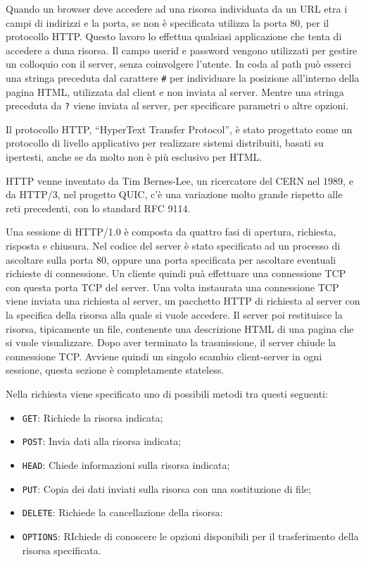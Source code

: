 \documentclass{article}
\numberwithin{equation}{subsection}
\begin{document}

Quando un browser deve accedere ad una risorsa individuata da un URL etra i campi di indirizzi e la porta, se non è specificata utilizza la porta 80, per il protocollo 
HTTP. Questo lavoro lo effettua qualsiasi applicazione che tenta di accedere a duna risorsa. 
Il campo userid e password vengono utilizzati per gestire un colloquio con il server, senza coinvolgere l'utente. In coda al path può esserci una stringa preceduta dal 
carattere \verb|#| per individuare la posizione all'interno della pagina HTML, utilizzata dal client e non inviata al server. 
Mentre una stringa preceduta da \verb|?| viene inviata al server, per specificare parametri o altre opzioni. 

Il protocollo HTTP, ``HyperText Transfer Protocol'', è stato progettato come un protocollo di livello applicativo per realizzare sistemi distribuiti, basati su 
ipertesti, anche se da molto non è più esclusivo per HTML. 


HTTP venne inventato da Tim Bernes-Lee, un ricercatore del CERN nel 1989, e da HTTP/3, nel progetto QUIC, c'è una variazione molto grande rispetto alle reti 
precedenti, con lo standard RFC 9114. 


Una sessione di HTTP/1.0 è composta da quattro fasi di apertura, richiesta, risposta e chiusura. Nel codice del server è stato specificato ad un processo di ascoltare 
sulla porta 80, oppure una porta specificata per ascoltare eventuali richieste di connessione. Un cliente quindi puà effettuare una connessione TCP con questa 
porta TCP del server. Una volta instaurata una connessione TCP viene inviata una richiesta al server, un pacchetto HTTP di richiesta al server con la specifica della 
risorsa alla quale si vuole accedere. Il server poi restituisce la risorsa, tipicamente un file, contenente una descrizione HTML di una pagina che si vuole visualizzare. 
Dopo aver terminato la trasmissione, il server chiude la connessione TCP. 
Avviene quindi un singolo scambio client-server in ogni sessione, questa sezione è completamente stateless. 

Nella richiesta viene specificato uno di possibili metodi tra questi seguenti:
\begin{itemize}
    \item \verb|GET|: Richiede la risorsa indicata;
    \item \verb|POST|: Invia dati alla risorsa indicata;
    \item \verb|HEAD|: Chiede informazioni sulla risorsa indicata;
    \item \verb|PUT|: Copia dei dati inviati sulla risorsa con una sostituzione di file;
    \item \verb|DELETE|: Richiede la cancellazione della risorsa:
    \item \verb|OPTIONS|: RIchiede di conoscere le opzioni disponibili per il trasferimento della risorsa specificata. 
\end{itemize}
\end{document}
